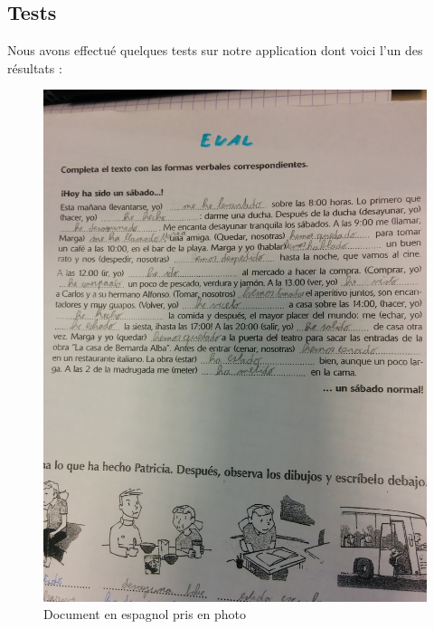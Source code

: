 \subsection{Tests}
Nous avons effectué quelques tests sur notre application dont voici l'un des résultats :
	\begin{figure}[H]
		\centering
		\includegraphics[scale=0.08]{images/testsImg.jpg}
		\caption{Document en espagnol pris en photo}
		\label{fig:image}
	\end{figure}
	
